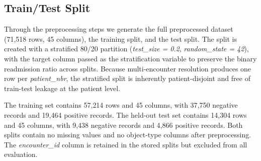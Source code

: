 \subsection{Train/Test Split}
\label{sec:data:split}

Through the preprocessing steps we generate the full preprocessed
dataset (71{,}518 rows, 45 columns), the training split, and the test
split. The split is created with a stratified 80/20 partition
(\emph{test\_size = 0.2}, \emph{random\_state = 42}), with the
target column passed as the stratification variable to preserve the
binary readmission ratio across splits. Because
multi-encounter resolution produces one row per
\emph{patient\_nbr}, the stratified split is inherently patient-disjoint
and free of train-test leakage at the patient level.

The training set contains 57{,}214 rows and 45 columns, with 37{,}750
negative records and 19{,}464 positive records. The held-out test set
contains 14{,}304 rows and 45 columns, with 9{,}438 negative records and
4{,}866 positive records. Both splits contain no missing values and no
object-type columns after preprocessing. The \emph{encounter\_id} column is
retained in the stored splits but excluded from all evaluation.
